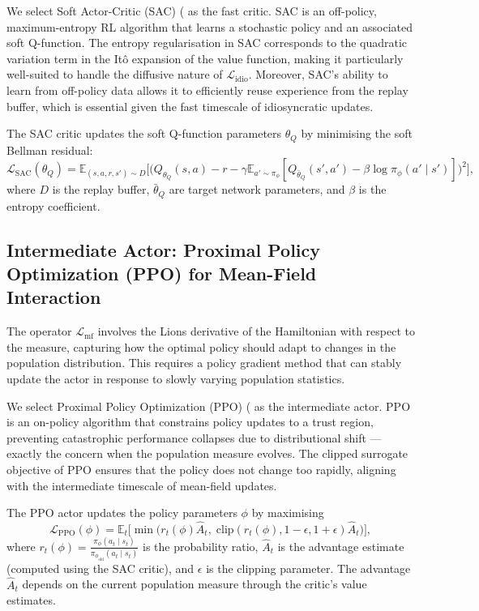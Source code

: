 We select Soft Actor-Critic (SAC) (\citep{haarnojaetal2018} as the fast critic. SAC is
an off-policy, maximum-entropy RL algorithm that learns a stochastic policy and an
associated soft Q-function. The entropy regularisation in SAC corresponds to the
quadratic variation term in the It\^o expansion of the value function, making it
particularly well-suited to handle the diffusive nature of $\mathcal{L}_{\mathrm{idio}}$.
Moreover, SAC's ability to learn from off-policy data allows it to efficiently reuse
experience from the replay buffer, which is essential given the fast timescale of
idiosyncratic updates.

The SAC critic updates the soft Q-function parameters $\theta_Q$ by minimising the
soft Bellman residual:
\begin{equation}
    \mathcal{L}_{\mathrm{SAC}}(\theta_Q) = \mathbb{E}_{(s,a,r,s') \sim D}\Big[
    \big( Q_{\theta_Q}(s,a) - r - \gamma \mathbb{E}_{a' \sim \pi_\phi}[
    Q_{\bar\theta_Q}(s',a') - \beta \log \pi_\phi(a' \mid s')] \big)^2 \Big],
    \label{eq:sac-loss}
\end{equation}
where $D$ is the replay buffer, $\bar\theta_Q$ are target network parameters, and
$\beta$ is the entropy coefficient.

\subsection{Intermediate Actor: Proximal Policy Optimization (PPO) for Mean-Field
Interaction}

The operator $\mathcal{L}_{\mathrm{mf}}$ involves the Lions derivative of the
Hamiltonian with respect to the measure, capturing how the optimal policy should
adapt to changes in the population distribution. This requires a policy gradient
method that can stably update the actor in response to slowly varying population
statistics.

We select Proximal Policy Optimization (PPO) (\citep{schulmanetal2017} as the
intermediate actor. PPO is an on-policy algorithm that constrains policy updates to a
trust region, preventing catastrophic performance collapses due to distributional
shift --- exactly the concern when the population measure evolves. The clipped
surrogate objective of PPO ensures that the policy does not change too rapidly,
aligning with the intermediate timescale of mean-field updates.

The PPO actor updates the policy parameters $\phi$ by maximising
\begin{equation}
    \mathcal{L}_{\mathrm{PPO}}(\phi) = \mathbb{E}_t\Big[ \min\big( r_t(\phi)
    \hat{A}_t, \; \mathrm{clip}(r_t(\phi), 1-\epsilon, 1+\epsilon) \hat{A}_t \big)
    \Big],
    \label{eq:ppo-loss}
\end{equation}
where $r_t(\phi) = \frac{\pi_\phi(a_t \mid s_t)}{\pi_{\phi_{\mathrm{old}}}(a_t \mid
s_t)}$ is the probability ratio, $\hat{A}_t$ is the advantage estimate (computed using
the SAC critic), and $\epsilon$ is the clipping parameter. The advantage $\hat{A}_t$
depends on the current population measure through the critic's value estimates.

